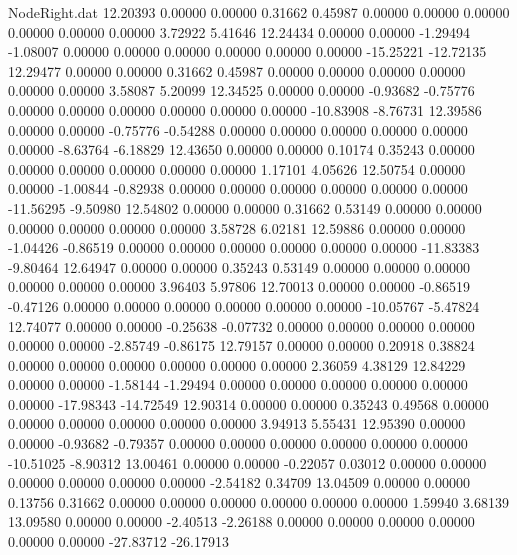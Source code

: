 \begin{filecontents}{NodeRight.dat}
  12.20393    0.00000    0.00000     0.31662    0.45987    0.00000    0.00000    0.00000    0.00000    0.00000    0.00000    3.72922    5.41646
  12.24434    0.00000    0.00000    -1.29494   -1.08007    0.00000    0.00000    0.00000    0.00000    0.00000    0.00000  -15.25221  -12.72135
  12.29477    0.00000    0.00000     0.31662    0.45987    0.00000    0.00000    0.00000    0.00000    0.00000    0.00000    3.58087    5.20099
  12.34525    0.00000    0.00000    -0.93682   -0.75776    0.00000    0.00000    0.00000    0.00000    0.00000    0.00000  -10.83908   -8.76731
  12.39586    0.00000    0.00000    -0.75776   -0.54288    0.00000    0.00000    0.00000    0.00000    0.00000    0.00000   -8.63764   -6.18829
  12.43650    0.00000    0.00000     0.10174    0.35243    0.00000    0.00000    0.00000    0.00000    0.00000    0.00000    1.17101    4.05626
  12.50754    0.00000    0.00000    -1.00844   -0.82938    0.00000    0.00000    0.00000    0.00000    0.00000    0.00000  -11.56295   -9.50980
  12.54802    0.00000    0.00000     0.31662    0.53149    0.00000    0.00000    0.00000    0.00000    0.00000    0.00000    3.58728    6.02181
  12.59886    0.00000    0.00000    -1.04426   -0.86519    0.00000    0.00000    0.00000    0.00000    0.00000    0.00000  -11.83383   -9.80464
  12.64947    0.00000    0.00000     0.35243    0.53149    0.00000    0.00000    0.00000    0.00000    0.00000    0.00000    3.96403    5.97806
  12.70013    0.00000    0.00000    -0.86519   -0.47126    0.00000    0.00000    0.00000    0.00000    0.00000    0.00000  -10.05767   -5.47824
  12.74077    0.00000    0.00000    -0.25638   -0.07732    0.00000    0.00000    0.00000    0.00000    0.00000    0.00000   -2.85749   -0.86175
  12.79157    0.00000    0.00000     0.20918    0.38824    0.00000    0.00000    0.00000    0.00000    0.00000    0.00000    2.36059    4.38129
  12.84229    0.00000    0.00000    -1.58144   -1.29494    0.00000    0.00000    0.00000    0.00000    0.00000    0.00000  -17.98343  -14.72549
  12.90314    0.00000    0.00000     0.35243    0.49568    0.00000    0.00000    0.00000    0.00000    0.00000    0.00000    3.94913    5.55431
  12.95390    0.00000    0.00000    -0.93682   -0.79357    0.00000    0.00000    0.00000    0.00000    0.00000    0.00000  -10.51025   -8.90312
  13.00461    0.00000    0.00000    -0.22057    0.03012    0.00000    0.00000    0.00000    0.00000    0.00000    0.00000   -2.54182    0.34709
  13.04509    0.00000    0.00000     0.13756    0.31662    0.00000    0.00000    0.00000    0.00000    0.00000    0.00000    1.59940    3.68139
  13.09580    0.00000    0.00000    -2.40513   -2.26188    0.00000    0.00000    0.00000    0.00000    0.00000    0.00000  -27.83712  -26.17913

\end{filecontents}
